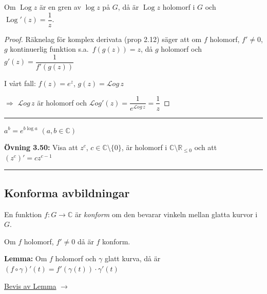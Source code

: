 \begin{theorem}[Proposition 3.19]
Om $\operatorname{Log} z$ är en gren av $\log z$ på $G$, då är $\operatorname{Log} z$ holomorf i $G$ och $\operatorname{Log}'(z) = \dfrac{1}{z}$.
\end{theorem}
\begin{proof}
Räknelag för komplex derivata \textcolor{magenta!80!black}{(prop 2.12)} säger att om $f$ holomorf, $f' \neq 0$, $g$ kontinuerlig funktion s.a.\ $f(g(z)) = z$, då $g$ holomorf och $g'(z) = \dfrac{1}{f'(g(z))}$

I vårt fall: $f(z) = e^z$, $g(z) = \mathcal{L}og\, z$

\textcolor{red!70!black}{$\Rightarrow$} $\mathcal{L}og\, z$ är holomorf och $\mathcal{L}og'(z) = \dfrac{1}{e^{\mathcal{L}og\, z}} = \dfrac{1}{z}$
\end{proof}

\noindent\rule{\linewidth}{0.4pt}

\begin{definition}
$a^b = e^{b \log a}$ \quad $(a, b \in \mathbb{C})$
\end{definition}

\textbf{Övning 3.50:} Visa att $z^c$, $c \in \mathbb{C} \setminus \{0\}$, är holomorf i $\mathbb{C} \setminus \mathbb{R}_{\le 0}$ och att $(z^c)' = cz^{c-1}$

\noindent\rule{\linewidth}{0.4pt}

\subsection{Konforma avbildningar}
\begin{definition}
En funktion $f : G \to \mathbb{C}$ är \emph{konform} om den bevarar vinkeln mellan glatta kurvor i $G$.
\end{definition}

\begin{theorem}[Proposition 2.11]
Om $f$ holomorf, $f' \neq 0$ då är $f$ konform.
\end{theorem}

\textbf{Lemma:} Om $f$ holomorf och $\gamma$ glatt kurva, då är $(f \circ \gamma)'(t) = f'(\gamma(t)) \cdot \gamma'(t)$

\hfill \textcolor{red!70!black}{\underline{Bevis av Lemma}} $\rightarrow$
